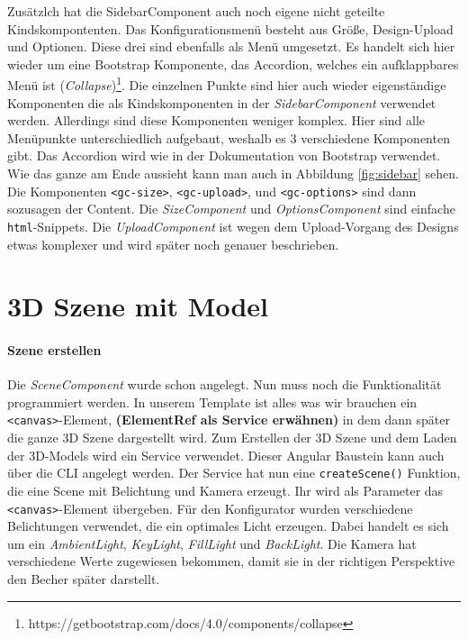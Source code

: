 Zusätzlch hat die SidebarComponent auch noch eigene nicht geteilte Kindskompontenten. Das Konfigurationsmenü besteht aus Größe, Design-Upload und Optionen. Diese drei sind ebenfalls als Menü umgesetzt. Es handelt sich hier wieder um eine Bootstrap Komponente, das Accordion, welches ein aufklappbares Menü ist (\textit{Collapse})\footnote{https://getbootstrap.com/docs/4.0/components/collapse}. Die einzelnen Punkte sind hier auch wieder eigenständige Komponenten die als Kindskomponenten in der \textit{SidebarComponent} verwendet werden. Allerdings sind diese Komponenten weniger komplex. Hier sind alle Menüpunkte unterschiedlich aufgebaut, weshalb es 3 verschiedene Komponenten gibt. Das Accordion wird wie in der Dokumentation von Bootstrap verwendet. Wie das ganze am Ende aussieht kann man auch in Abbildung \ref{fig:sidebar} sehen. Die Komponenten \texttt{<gc-size>}, \texttt{<gc-upload>}, und \texttt{<gc-options>} sind dann sozusagen der Content. Die \textit{SizeComponent} und \textit{OptionsComponent} sind einfache \texttt{html}-Snippets. Die \textit{UploadComponent} ist wegen dem Upload-Vorgang des Designs etwas komplexer und wird später noch genauer beschrieben.
%
\section{3D Szene mit Model}
\label{sec:umsetzung}
%
\paragraph{Szene erstellen}Die \textit{SceneComponent} wurde schon angelegt. Nun muss noch die Funktionalität programmiert werden. In unserem Template ist alles was wir brauchen ein \texttt{<canvas>}-Element, \textbf{(ElementRef als Service erwähnen) }in dem dann später die ganze 3D Szene dargestellt wird. Zum Erstellen der 3D Szene und dem Laden der 3D-Models wird ein Service verwendet. Dieser Angular Baustein kann auch über die CLI angelegt werden. Der Service hat nun eine \texttt{createScene()} Funktion, die eine Scene mit Belichtung und Kamera erzeugt. Ihr wird als Parameter das \texttt{<canvas>}-Element übergeben. Für den Konfigurator wurden verschiedene Belichtungen verwendet, die ein optimales Licht erzeugen. Dabei handelt es sich um ein \textit{AmbientLight}, \textit{KeyLight}, \textit{FillLight} und \textit{BackLight}. Die Kamera hat verschiedene Werte zugewiesen bekommen, damit sie in der richtigen Perspektive den Becher später darstellt.
%
